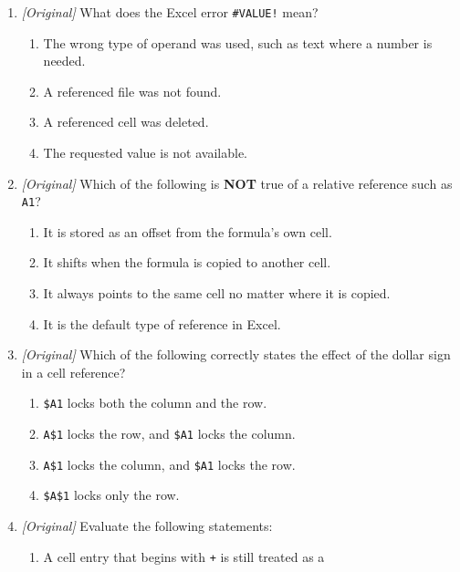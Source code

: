 \begin{enumerate}[label=\textbf{Q\arabic*.}, leftmargin=*]
\begin{enumerate}[label=\Alph*.]
    \item A formula divides by zero.
    \item A text value was used where a number was expected.
    \item The formula is missing its leading \texttt{=}.
  \end{enumerate}
\item \textit{[Original]} What does the Excel error \texttt{\#VALUE!} mean?
  \begin{enumerate}[label=\Alph*.]
    \item The wrong type of operand was used, such as text where a number is
      needed.
    \item A referenced file was not found.
    \item A referenced cell was deleted.
    \item The requested value is not available.
  \end{enumerate}
\item \textit{[Original]} Which of the following is \textbf{NOT} true of a
  relative reference such as \texttt{A1}?
  \begin{enumerate}[label=\Alph*.]
    \item It is stored as an offset from the formula's own cell.
    \item It shifts when the formula is copied to another cell.
    \item It always points to the same cell no matter where it is copied.
    \item It is the default type of reference in Excel.
  \end{enumerate}
\item \textit{[Original]} Which of the following correctly states the effect
  of the dollar sign in a cell reference?
  \begin{enumerate}[label=\Alph*.]
    \item \texttt{\$A1} locks both the column and the row.
    \item \texttt{A\$1} locks the row, and \texttt{\$A1} locks the column.
    \item \texttt{A\$1} locks the column, and \texttt{\$A1} locks the row.
    \item \texttt{\$A\$1} locks only the row.
  \end{enumerate}
\item \textit{[Original]} Evaluate the following statements:
  \begin{enumerate}[label=\Roman*.]
    \item A cell entry that begins with \texttt{+} is still treated as a

\end{enumerate}
\end{enumerate}
